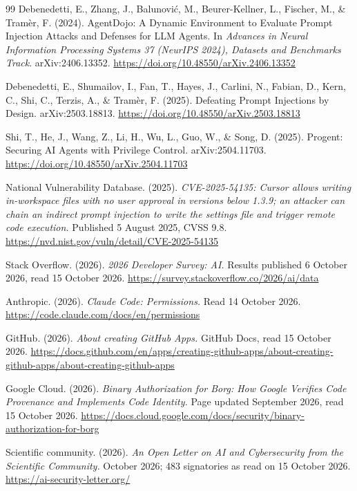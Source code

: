 \documentclass[11pt]{article}
\theoremstyle{definition}
\begin{document}
\begin{thebibliography}{99}
Debenedetti, E., Zhang, J., Balunović, M., Beurer-Kellner, L., Fischer, M., \& Tramèr, F. (2024). AgentDojo: A Dynamic Environment to Evaluate Prompt Injection Attacks and Defenses for LLM Agents. In \textit{Advances in Neural Information Processing Systems 37 (NeurIPS 2024), Datasets and Benchmarks Track}. arXiv:2406.13352. \url{https://doi.org/10.48550/arXiv.2406.13352}

Debenedetti, E., Shumailov, I., Fan, T., Hayes, J., Carlini, N., Fabian, D., Kern, C., Shi, C., Terzis, A., \& Tramèr, F. (2025). Defeating Prompt Injections by Design. arXiv:2503.18813. \url{https://doi.org/10.48550/arXiv.2503.18813}

Shi, T., He, J., Wang, Z., Li, H., Wu, L., Guo, W., \& Song, D. (2025). Progent: Securing AI Agents with Privilege Control. arXiv:2504.11703. \url{https://doi.org/10.48550/arXiv.2504.11703}

National Vulnerability Database. (2025). \textit{CVE-2025-54135: Cursor allows writing in-workspace files with no user approval in versions below 1.3.9; an attacker can chain an indirect prompt injection to write the settings file and trigger remote code execution.} Published 5 August 2025, CVSS 9.8. \url{https://nvd.nist.gov/vuln/detail/CVE-2025-54135}

Stack Overflow. (2026). \textit{2026 Developer Survey: AI.} Results published 6 October 2026, read 15 October 2026. \url{https://survey.stackoverflow.co/2026/ai/data}

Anthropic. (2026). \textit{Claude Code: Permissions.} Read 14 October 2026. \url{https://code.claude.com/docs/en/permissions}

GitHub. (2026). \textit{About creating GitHub Apps.} GitHub Docs, read 15 October 2026. \url{https://docs.github.com/en/apps/creating-github-apps/about-creating-github-apps/about-creating-github-apps}

Google Cloud. (2026). \textit{Binary Authorization for Borg: How Google Verifies Code Provenance and Implements Code Identity.} Page updated September 2026, read 15 October 2026. \url{https://docs.cloud.google.com/docs/security/binary-authorization-for-borg}

Scientific community. (2026). \textit{An Open Letter on AI and Cybersecurity from the Scientific Community.} October 2026; 483 signatories as read on 15 October 2026. \url{https://ai-security-letter.org/}


\end{thebibliography}
\end{document}
